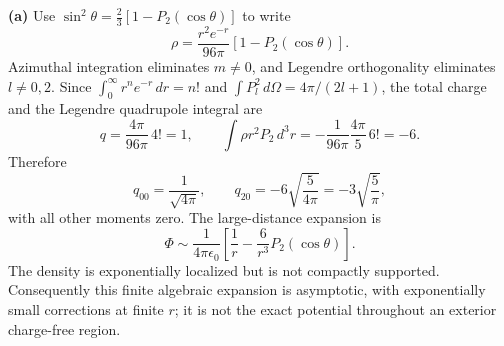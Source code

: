\textbf{(a)} Use $\sin^2\theta=\frac23[1-P_2(\cos\theta)]$ to write
\[
\rho=\frac{r^2e^{-r}}{96\pi}[1-P_2(\cos\theta)].
\]
Azimuthal integration eliminates $m\ne0$, and Legendre orthogonality
eliminates $l\ne0,2$. Since
$\int_0^\infty r^ne^{-r}\,dr=n!$ and
$\int P_l^2\,d\Omega=4\pi/(2l+1)$, the total charge and the
Legendre quadrupole integral are
\[
q=\frac{4\pi}{96\pi}\,4!=1,\qquad
\int\rho r^2P_2\,d^3r=-\frac{1}{96\pi}\frac{4\pi}{5}\,6!=-6.
\]
Therefore
\[
\boxed{q_{00}=\frac1{\sqrt{4\pi}},\qquad
q_{20}=-6\sqrt{\frac5{4\pi}}=-3\sqrt{\frac5\pi},}
\]
with all other moments zero. The large-distance expansion is
\[
\boxed{\Phi\sim\frac{1}{4\pi\epsilon_0}
\left[\frac1r-\frac6{r^3}P_2(\cos\theta)\right].}
\]
The density is exponentially localized but is not compactly supported.
Consequently this finite algebraic expansion is asymptotic, with
exponentially small corrections at finite $r$; it is not the exact
potential throughout an exterior charge-free region.

